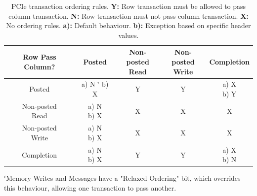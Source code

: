 \begin{table}[!htb]
    \centering
    \begin{tabular}{|c|c|c|c|c|}
        \hline
        Row Pass Column? & Posted & \makecell{Non-posted \\ Read} & \makecell{Non-posted \\ Write} & Completion \\
        
        \hline
        Posted & \makecell{a) N $^{i}$ \\ b) X}
        & Y & Y & \makecell{a) X \\ b) Y } \\
        
        \hline
        \makecell{Non-posted \\ Read} & \makecell{a) N \\ b) X} & X & X & X \\
        
        \hline
        \makecell{Non-posted \\ Write} & \makecell{a) N \\ b) X} & X & X & X \\
        
        \hline
        Completion & \makecell{a) N \\ b) X} & Y & Y & \makecell{a) X \\ b) N} \\
        \hline
    
    \end{tabular}
    \footnotesize{$^i$Memory Writes and Messages have a "Relaxed Ordering" bit, which overrides this behaviour, allowing one transaction to pass another.} 
    \caption{
    PCIe transaction ordering rules. 
    \textbf{Y:} Row transaction must be allowed to pass column transaction. 
    \textbf{N:} Row transaction must not pass column transaction. 
    \textbf{X:} No ordering rules.
    \textbf{a):} Default behaviour.
    \textbf{b):} Exception based on specific header values.
    }
    \label{tab:pcie-transaction-ordering-rules}
\end{table}
